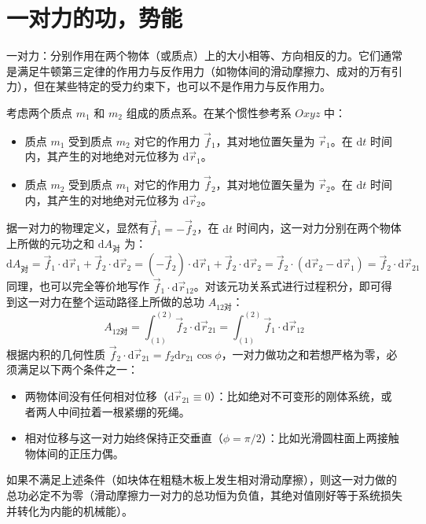 
\section{一对力的功，势能}

\begin{definition}[一对力]
一对力：分别作用在两个物体（或质点）上的大小相等、方向相反的力。它们通常是满足牛顿第三定律的作用力与反作用力（如物体间的滑动摩擦力、成对的万有引力），但在某些特定的受力约束下，也可以不是作用力与反作用力。
\end{definition}
考虑两个质点 $m_1$ 和 $m_2$ 组成的质点系。在某个惯性参考系 $Oxyz$ 中：
\begin{itemize}
\item 质点 $m_1$ 受到质点 $m_2$ 对它的作用力 $\vec{f}_1$，其对地位置矢量为 $\vec{r}_1$。在 $\mathrm{d}t$ 时间内，其产生的对地绝对元位移为 $\mathrm{d}\vec{r}_1$。
\item 质点 $m_2$ 受到质点 $m_1$ 对它的作用力 $\vec{f}_2$，其对地位置矢量为 $\vec{r}_2$。在 $\mathrm{d}t$ 时间内，其产生的对地绝对元位移为 $\mathrm{d}\vec{r}_2$。
\end{itemize}
据一对力的物理定义，显然有$\vec{f}_1 = -\vec{f}_2$，在 $\mathrm{d}t$ 时间内，这一对力分别在两个物体上所做的元功之和 $\mathrm{d}A_{\text{对}}$ 为：
$$\mathrm{d}A_{\text{对}} = \vec{f}_1 \cdot \mathrm{d}\vec{r}_1 + \vec{f}_2 \cdot \mathrm{d}\vec{r}_2= (-\vec{f}_2) \cdot \mathrm{d}\vec{r}_1 + \vec{f}_2 \cdot \mathrm{d}\vec{r}_2 = \vec{f}_2 \cdot (\mathrm{d}\vec{r}_2 - \mathrm{d}\vec{r}_1)= \vec{f}_2 \cdot \mathrm{d}\vec{r}_{21}$$同理，也可以完全等价地写作 $\vec{f}_1 \cdot \mathrm{d}\vec{r}_{12}$。对该元功关系式进行过程积分，即可得到这一对力在整个运动路径上所做的总功 $A_{12\text{对}}$：
$$A_{12\text{对}} = \int_{(1)}^{(2)} \vec{f}_2 \cdot \mathrm{d}\vec{r}_{21} = \int_{(1)}^{(2)} \vec{f}_1 \cdot \mathrm{d}\vec{r}_{12}$$
根据内积的几何性质 $\vec{f}_2 \cdot \mathrm{d}\vec{r}_{21} = f_2 \mathrm{d}r_{21} \cos\phi$，一对力做功之和若想严格为零，必须满足以下两个条件之一：
\begin{itemize}
\item 两物体间没有任何相对位移（$\mathrm{d}\vec{r}_{21} \equiv 0$）：比如绝对不可变形的刚体系统，或者两人中间拉着一根紧绷的死绳。
\item 相对位移与这一对力始终保持正交垂直（$\phi = \pi/2$）：比如光滑圆柱面上两接触物体间的正压力偶。
\end{itemize}
如果不满足上述条件（如块体在粗糙木板上发生相对滑动摩擦），则这一对力做的总功必定不为零（滑动摩擦力一对力的总功恒为负值，其绝对值刚好等于系统损失并转化为内能的机械能）。

